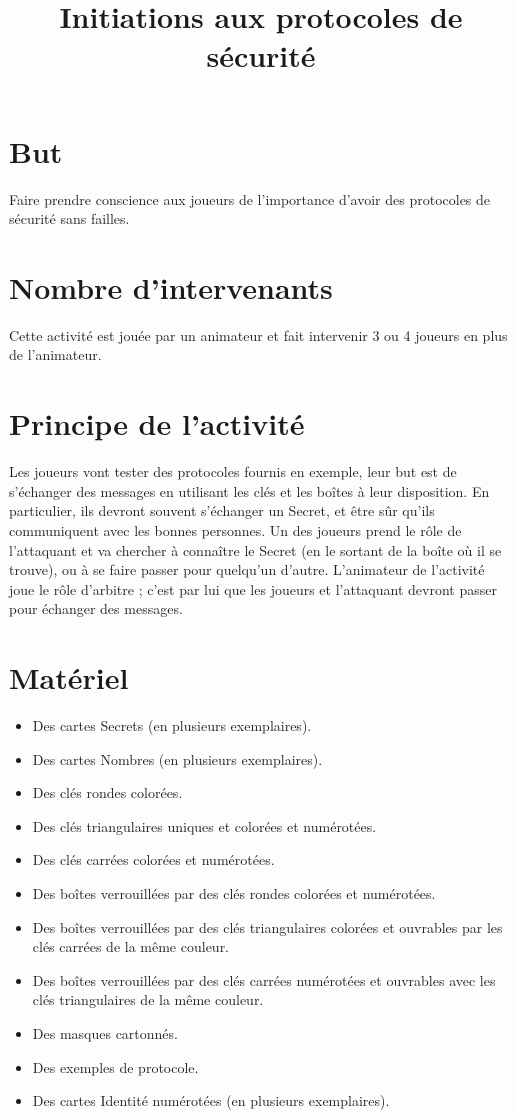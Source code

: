 \documentclass[a4paper,10pt]{article}
\title{Initiations aux protocoles de sécurité}
\date{}
\begin{document}
\maketitle


\section{But}
Faire prendre conscience aux joueurs de l'importance d'avoir des protocoles de sécurité sans failles.

\section{Nombre d'intervenants}
Cette activité est jouée par un animateur et fait intervenir 3 ou 4 joueurs en plus de l'animateur.

\section{Principe de l'activité}
Les joueurs vont tester des protocoles fournis en exemple, leur but est de s'échanger des messages en utilisant les clés et les boîtes à leur disposition. En particulier, ils devront souvent s'échanger un Secret, et être sûr qu'ils communiquent avec les bonnes personnes. Un des joueurs prend le rôle de l'attaquant et va chercher à connaître le Secret (en le sortant de la boîte où il se trouve), ou à se faire passer pour quelqu'un d'autre. L'animateur de l'activité joue le rôle d'arbitre ; c'est par lui que les joueurs et l'attaquant devront passer pour échanger des messages.

\section{Matériel}
\begin{itemize}
\item Des cartes Secrets (en plusieurs exemplaires).
\item Des cartes Nombres (en plusieurs exemplaires).
\item Des clés rondes colorées.
\item Des clés triangulaires uniques et colorées et numérotées.
\item Des clés carrées colorées et numérotées.
\item Des boîtes verrouillées par des clés rondes colorées et numérotées.
\item Des boîtes verrouillées par des clés triangulaires colorées et ouvrables par les clés carrées de la même couleur.
\item Des boîtes verrouillées par des clés carrées numérotées et ouvrables avec les clés triangulaires de la même couleur.
\item Des masques cartonnés.
\item Des exemples de protocole.
\item Des cartes Identité numérotées (en plusieurs exemplaires).
\end{itemize}
\end{document}
